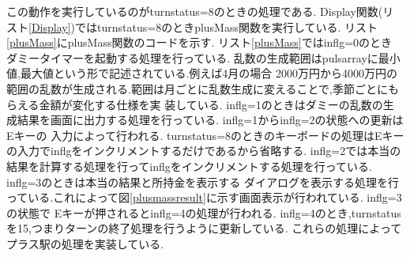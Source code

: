 \documentclass[a4j]{jarticle}
\begin{document}
    この動作を実行しているのがturnstatus=8のときの処理である.
    Display関数(リスト\ref{Display})ではturnstatus=8のときplusMass関数を実行している.
    リスト\ref{plusMass}にplusMass関数のコードを示す. リスト\ref{plusMass}ではinflg=0のとき
    ダミータイマーを起動する処理を行っている. 乱数の生成範囲はpulsarrayに最小値,最大値という形で記述されている.例えば4月の場合
    2000万円から4000万円の範囲の乱数が生成される.範囲は月ごとに乱数生成に変えることで,季節ごとにもらえる金額が変化する仕様を実
    装している. inflg=1のときはダミーの乱数の生成結果を画面に出力する処理を行っている. inflg=1からinflg=2の状態への更新はEキーの
    入力によって行われる. turnstatus=8のときのキーボードの処理はEキーの入力でinflgをインクリメントするだけであるから省略する.
    inflg=2では本当の結果を計算する処理を行ってinflgをインクリメントする処理を行っている. inflg=3のときは本当の結果と所持金を表示する
    ダイアログを表示する処理を行っている.これによって図\ref{plusmassresult}に示す画面表示が行われている. inflg=3の状態で
    Eキーが押されるとinflg=4の処理が行われる. inflg=4のとき,turnstatusを15,つまりターンの終了処理を行うように更新している.
    これらの処理によってプラス駅の処理を実装している.
\end{document}
